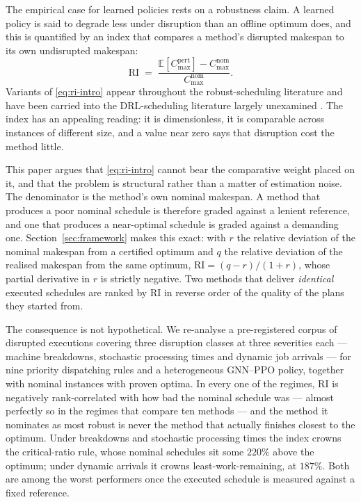 \documentclass[a4paper,fleqn]{cas-sc}
\newcommand{\Cmax}{C_{\max}}
\newcommand{\RI}{\mathrm{RI}}
\begin{document}
The empirical case for learned policies rests on a robustness claim. A learned
policy is said to degrade less under disruption than an offline optimum does,
and this is quantified by an index that compares a method's disrupted makespan
to its own undisrupted makespan:
\begin{equation}\label{eq:ri-intro}
  \RI \;=\; \frac{\mathbb{E}\!\left[\Cmax^{\text{pert}}\right]-\Cmax^{\text{nom}}}
                 {\Cmax^{\text{nom}}}.
\end{equation}
Variants of \eqref{eq:ri-intro} appear throughout the robust-scheduling
literature \citep{leon1994,mehta1998,goren2008,sabuncuoglu2000} and have been
carried into the DRL-scheduling literature largely unexamined
\citep{smit2025,huang2025,xu2024survey}. The index has an appealing reading: it
is dimensionless, it is comparable across instances of different size, and a
value near zero says that disruption cost the method little.

This paper argues that \eqref{eq:ri-intro} cannot bear the comparative weight
placed on it, and that the problem is structural rather than a matter of
estimation noise. The denominator is the method's own nominal makespan. A method
that produces a poor nominal schedule is therefore graded against a lenient
reference, and one that produces a near-optimal schedule is graded against a
demanding one. Section~\ref{sec:framework} makes this exact: with $r$ the
relative deviation of the nominal makespan from a certified optimum and $q$ the
relative deviation of the realised makespan from the same optimum,
$\RI=(q-r)/(1+r)$, whose partial derivative in $r$ is strictly negative. Two
methods that deliver \emph{identical} executed schedules are ranked by $\RI$ in
reverse order of the quality of the plans they started from.

The consequence is not hypothetical. We re-analyse a pre-registered corpus of
\NRunsDisrupted{} disrupted executions covering three disruption classes at three
severities each --- machine breakdowns, stochastic processing times and dynamic
job arrivals --- for nine priority dispatching rules and a heterogeneous
GNN--PPO policy, together with \NInstances{} nominal instances with proven
optima. In every one of the \NRegimes{} regimes, $\RI$ is negatively
rank-correlated with how bad the nominal schedule was --- almost perfectly so in
the \NConfRegimes{} regimes that compare ten methods --- and the method it
nominates as most robust is never the method that actually finishes closest to
the optimum. Under breakdowns and stochastic processing times the index crowns
the critical-ratio rule, whose nominal schedules sit some $220\%$ above the
optimum; under dynamic arrivals it crowns least-work-remaining, at $187\%$. Both
are among the worst performers once the executed schedule is measured against a
fixed reference.
\end{document}
